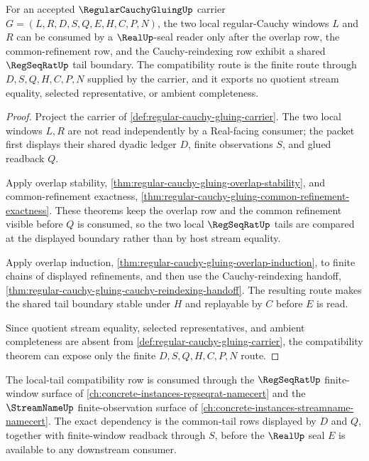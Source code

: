 \begin{theorem}
\label{thm:regular-cauchy-gluing-local-tail-compatibility}
For an accepted $\RegularCauchyGluingUp$ carrier $G=(L,R,D,S,Q,E,H,C,P,N)$, the two local regular-Cauchy windows $L$ and $R$ can be consumed by a $\RealUp$-seal reader only after the overlap row, the common-refinement row, and the Cauchy-reindexing row exhibit a shared $\RegSeqRatUp$ tail boundary. The compatibility route is the finite route through $D,S,Q,H,C,P,N$ supplied by the carrier, and it exports no quotient stream equality, selected representative, or ambient completeness.
\end{theorem}
\begin{proof}
Project the carrier of \autoref{def:regular-cauchy-gluing-carrier}. The two local windows $L,R$ are not read independently by a Real-facing consumer; the packet first displays their shared dyadic ledger $D$, finite observations $S$, and glued readback $Q$.

Apply overlap stability, \autoref{thm:regular-cauchy-gluing-overlap-stability}, and common-refinement exactness, \autoref{thm:regular-cauchy-gluing-common-refinement-exactness}. These theorems keep the overlap row and the common refinement visible before $Q$ is consumed, so the two local $\RegSeqRatUp$ tails are compared at the displayed boundary rather than by host stream equality.

Apply overlap induction, \autoref{thm:regular-cauchy-gluing-overlap-induction}, to finite chains of displayed refinements, and then use the Cauchy-reindexing handoff, \autoref{thm:regular-cauchy-gluing-cauchy-reindexing-handoff}. The resulting route makes the shared tail boundary stable under $H$ and replayable by $C$ before $E$ is read.

Since quotient stream equality, selected representatives, and ambient completeness are absent from \autoref{def:regular-cauchy-gluing-carrier}, the compatibility theorem can expose only the finite $D,S,Q,H,C,P,N$ route.
\end{proof}

The local-tail compatibility row is consumed through the $\RegSeqRatUp$ finite-window surface of \autoref{ch:concrete-instances-regseqrat-namecert} and the $\StreamNameUp$ finite-observation surface of \autoref{ch:concrete-instances-streamname-namecert}. The exact dependency is the common-tail rows displayed by $D$ and $Q$, together with finite-window readback through $S$, before the $\RealUp$ seal $E$ is available to any downstream consumer.

